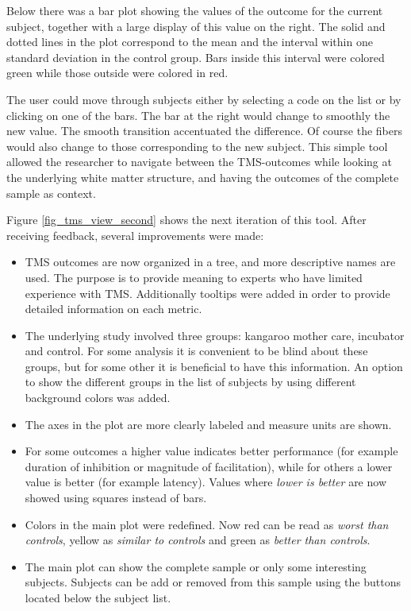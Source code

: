 Below there was a bar plot showing the values of the outcome for the current subject, together with a large display of this value on the right. The solid and dotted lines in the plot correspond to the mean and the interval within one standard deviation in the control group. Bars inside this interval were colored green while those outside were colored in red.

The user could move through subjects either by selecting a code on the list or by clicking on one of the bars. The bar at the right would change to smoothly the new value. The smooth transition accentuated the difference. Of course the fibers would also change to those corresponding to the new subject. This simple tool allowed the researcher to navigate between the TMS-outcomes  while looking at the underlying white matter structure, and having the outcomes of the complete sample as context. 

Figure \ref{fig_tms_view_second} shows the next iteration of this tool. After receiving feedback, several improvements were made:
\begin{itemize}
	\item TMS outcomes are now organized in a tree, and more descriptive names are used. The purpose is to provide meaning to experts who have limited experience with TMS. Additionally tooltips were added in order to provide detailed information on each metric.
	\item The underlying study involved three groups: kangaroo mother care, incubator and control. For some analysis it is convenient to be blind about these groups, but for some other it is beneficial to have this information. An option to show the different groups in the list of subjects by using different background colors was added.
	\item The axes in the plot are more clearly labeled and measure units are shown. 
	\item For some outcomes a higher value indicates better performance (for example duration of inhibition or magnitude of facilitation), while for others a lower value is better (for example latency). Values where \emph{lower is better} are now showed using squares instead of bars.
	\item Colors in the main plot were redefined. Now red can be read as \emph{worst than controls}, yellow as \emph{similar to controls} and green as \emph{better than controls}.
	\item The main plot can show the complete sample or only some interesting subjects. Subjects can be add or removed from this sample using the buttons located below the subject list.
\end{itemize}

